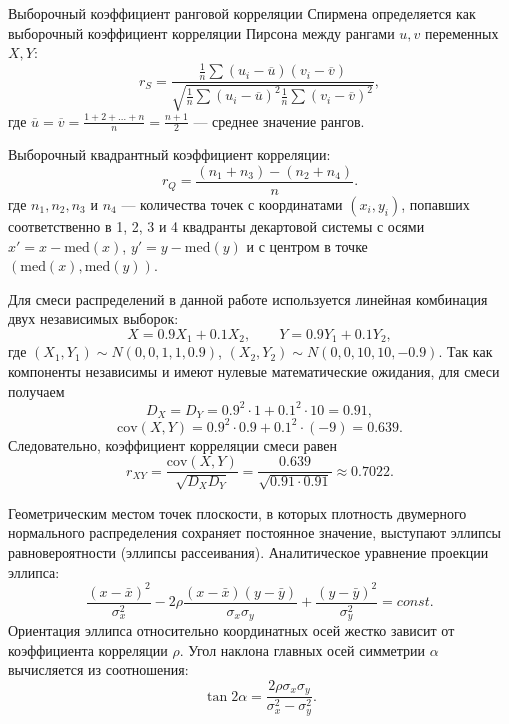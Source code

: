 \documentclass[a4paper, 14pt]{extarticle}
\begin{document}
Выборочный коэффициент ранговой корреляции Спирмена определяется как выборочный коэффициент корреляции Пирсона между рангами $u, v$ переменных $X,Y$:
\begin{equation*}
    r_S = \frac{\frac{1}{n} \sum(u_i - \overline{u})(v_i - \overline{v})}{\sqrt{\frac{1}{n} \sum(u_i - \overline{u})^2 \frac{1}{n} \sum(v_i - \overline{v})^2}},
\end{equation*}
где $\overline{u} = \overline{v} = \frac{1 + 2 + \dots + n}{n} = \frac{n + 1}{2}$ --- среднее значение рангов.

Выборочный квадрантный коэффициент корреляции:
\begin{equation*}
    r_Q = \frac{(n_1 + n_3) - (n_2 + n_4)}{n}.
\end{equation*}
где $n_1, n_2, n_3$ и $n_4$ --- количества точек с координатами $(x_i,y_i)$, попавших соответственно в 1, 2, 3 и 4 квадранты декартовой системы с осями $x' = x - \mathrm{med}(x)$, $y' = y - \mathrm{med}(y)$ и с центром в точке $(\mathrm{med}(x), \mathrm{med}(y))$.

Для смеси распределений в данной работе используется линейная комбинация двух независимых выборок:
\begin{equation*}
    X = 0.9X_1 + 0.1X_2, \qquad Y = 0.9Y_1 + 0.1Y_2,
\end{equation*}
где $(X_1, Y_1) \sim N(0,0,1,1,0.9)$, $(X_2, Y_2) \sim N(0,0,10,10,-0.9)$. Так как компоненты независимы и имеют нулевые математические ожидания, для смеси получаем
\begin{equation*}
    D_X = D_Y = 0.9^2 \cdot 1 + 0.1^2 \cdot 10 = 0.91,
\end{equation*}
\begin{equation*}
    \mathrm{cov}(X,Y) = 0.9^2 \cdot 0.9 + 0.1^2 \cdot (-9) = 0.639.
\end{equation*}
Следовательно, коэффициент корреляции смеси равен
\begin{equation*}
    r_{XY} = \frac{\mathrm{cov}(X,Y)}{\sqrt{D_X D_Y}} = \frac{0.639}{\sqrt{0.91 \cdot 0.91}} \approx 0.7022.
\end{equation*}

Геометрическим местом точек плоскости, в которых плотность двумерного нормального распределения сохраняет постоянное значение, выступают эллипсы равновероятности (эллипсы рассеивания). Аналитическое уравнение проекции эллипса:
\begin{equation*}
    \frac{(x - \bar{x})^2}{\sigma_x^2} - 2\rho\frac{(x - \bar{x})(y - \bar{y})}{\sigma_x\sigma_y} + \frac{(y - \bar{y})^2}{\sigma_y^2} = const.
\end{equation*}
Ориентация эллипса относительно координатных осей жестко зависит от коэффициента корреляции $\rho$. Угол наклона главных осей симметрии $\alpha$ вычисляется из соотношения:
\begin{equation*}
    \tan 2\alpha = \frac{2\rho\sigma_x\sigma_y}{\sigma_x^2 - \sigma_y^2}.
\end{equation*}
\end{document}
